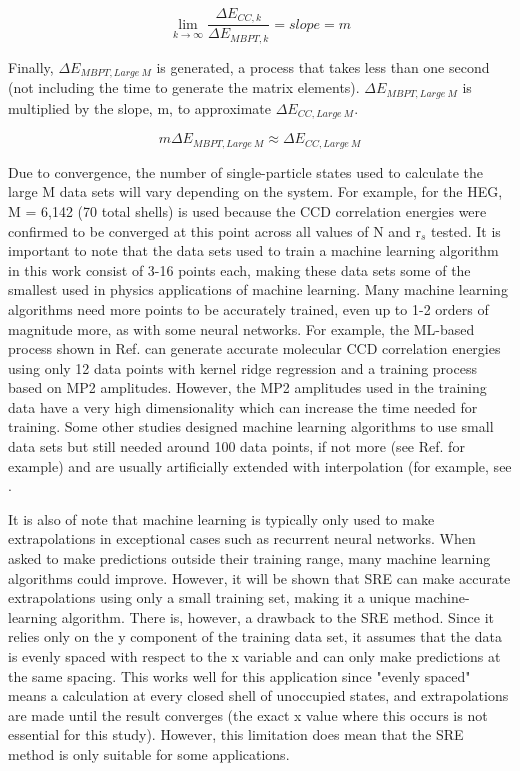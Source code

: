 \begin{equation}
\lim_{k\to\infty} \frac{\Delta E_{CC,k}}{\Delta E_{MBPT,k}} = slope = m
\end{equation}

Finally, $\Delta E_{MBPT, Large\ M}$  is generated, a process that takes less than one second (not including the time to generate the matrix elements). $\Delta E_{MBPT, Large\ M}$ is multiplied by the slope, m, to approximate $\Delta E_{CC, Large\ M}$.

\begin{equation}
m\Delta E_{MBPT,Large\ M} \approx \Delta E_{CC,Large\ M}
\end{equation}

Due to convergence, the number of single-particle states used to calculate the large M data sets will vary depending on the system. For example, for the HEG, M = 6,142 (70 total shells) is used because the CCD correlation energies were confirmed to be converged at this point across all values of N and r$_s$ tested. It is important to note that the data sets used to train a machine learning algorithm in this work consist of 3-16 points each, making these data sets some of the smallest used in physics applications of machine learning. Many machine learning algorithms need more points to be accurately trained, even up to 1-2 orders of magnitude more, as with some neural networks. For example, the ML-based process shown in Ref. \cite{Ref7} can generate accurate molecular CCD correlation energies using only 12 data points with kernel ridge regression and a training process based on MP2 amplitudes. However, the MP2 amplitudes used in the training data have a very high dimensionality which can increase the time needed for training. Some other studies designed machine learning algorithms to use small data sets but still needed around 100 data points, if not more (see Ref. \cite{Ref17} for example) and are usually artificially extended with interpolation (for example, see \cite{Ref6}. 

It is also of note that machine learning is typically only used to make extrapolations in exceptional cases such as recurrent neural networks. When asked to make predictions outside their training range, many machine learning algorithms could improve. However, it will be shown that SRE can make accurate extrapolations using only a small training set, making it a unique machine-learning algorithm. There is, however, a drawback to the SRE method. Since it relies only on the y component of the training data set, it assumes that the data is evenly spaced with respect to the x variable and can only make predictions at the same spacing. This works well for this application since "evenly spaced" means a calculation at every closed shell of unoccupied states, and extrapolations are made until the result converges (the exact x value where this occurs is not essential for this study). However, this limitation does mean that the SRE method is only suitable for some applications.

